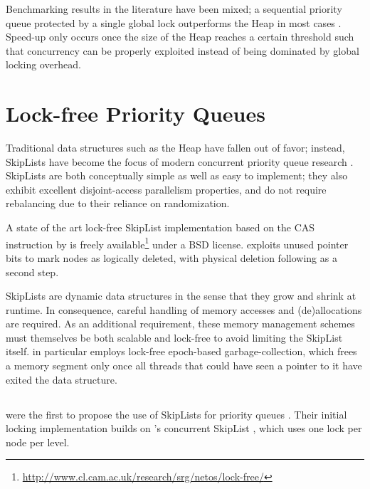 Benchmarking results in the literature have been mixed; a sequential priority
queue protected by a single global lock outperforms the \citeauthor{hunt1996efficient}
Heap in most cases \cite{hunt1996efficient,sundell2003fast}. Speed-up only occurs once
the size of the Heap reaches a certain threshold such that concurrency
can be properly exploited instead of being dominated by global locking overhead.

\section{Lock-free Priority Queues} \label{sec:lockfree}

Traditional data structures such as the Heap have fallen out of favor;
instead, SkipLists \cite{pugh1990skip,pugh1998concurrent} have become the focus
of modern concurrent priority queue research
\cite{shavit2000skiplist,sundell2003fast,herlihy2012art,linden2013skiplist,alistarhspraylist}.
SkipLists are both conceptually simple as well as easy to implement; they also exhibit
excellent disjoint-access parallelism properties, and do not require rebalancing due to their
reliance on randomization.

A state of the art lock-free SkipList implementation based on the \ac{CAS} instruction
by \citeauthor{fraser2004practical} \cite{fraser2004practical} is freely available\footnote{
\url{http://www.cl.cam.ac.uk/research/srg/netos/lock-free/}} under a BSD license.
\citeauthor{fraser2004practical} exploits unused pointer bits to mark nodes as logically
deleted, with physical deletion following as a second step.

SkipLists are dynamic data structures in the sense that they grow and shrink
at runtime. In consequence, careful handling of memory accesses and (de)allocations
are required. As an additional requirement, these memory management schemes must
themselves be both scalable and lock-free to avoid limiting the SkipList itself.
\citeauthor{fraser2004practical} in particular employs lock-free epoch-based garbage-collection,
which frees a memory segment only once all threads that could have seen a pointer to it have
exited the data structure.


\subsection{\citeauthor{shavit2000skiplist}} \label{sec:shavit}

\citeauthor{shavit2000skiplist} were the first to propose the use of SkipLists
for priority queues \cite{linden2013skiplist}. Their initial locking implementation
\cite{shavit2000skiplist} builds on \citeauthor{pugh1998concurrent}'s concurrent
SkipList \cite{pugh1998concurrent}, which uses one lock per node per level.

